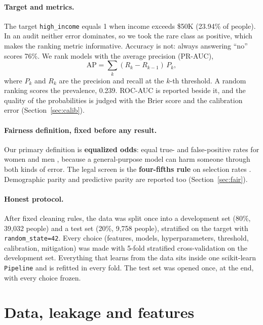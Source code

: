 \documentclass[11pt,a4paper]{article}
\newcommand{\code}[1]{\texttt{#1}}
\begin{document}
\paragraph{Target and metrics.} The target \code{high\_income} equals 1 when income exceeds \$50K (23.94\% of people). In an audit neither error dominates, so we took the rare class as positive, which makes the ranking metric informative. Accuracy is not: always answering ``no'' scores 76\%. We rank models with the average precision (PR-AUC),
\begin{equation}
\mathrm{AP} = \sum_k (R_k - R_{k-1})\,P_k ,
\end{equation}
where $P_k$ and $R_k$ are the precision and recall at the $k$-th threshold. A random ranking scores the prevalence, 0.239. ROC-AUC is reported beside it, and the quality of the probabilities is judged with the Brier score and the calibration error (Section~\ref{sec:calib}).

\paragraph{Fairness definition, fixed before any result.} Our primary definition is \textbf{equalized odds}: equal true- and false-positive rates for women and men \cite{hardt2016}, because a general-purpose model can harm someone through both kinds of error. The legal screen is the \textbf{four-fifths rule} on selection rates \cite{eeoc1978}. Demographic parity and predictive parity are reported too (Section~\ref{sec:fair}).

\paragraph{Honest protocol.} After fixed cleaning rules, the data was split once into a development set (80\%, 39{,}032 people) and a test set (20\%, 9{,}758 people), stratified on the target with \code{random\_state=42}. Every choice (features, models, hyperparameters, threshold, calibration, mitigation) was made with 5-fold stratified cross-validation on the development set. Everything that learns from the data sits inside one scikit-learn \code{Pipeline} \cite{pedregosa2011} and is refitted in every fold. The test set was opened once, at the end, with every choice frozen.

\section{Data, leakage and features}
\end{document}
